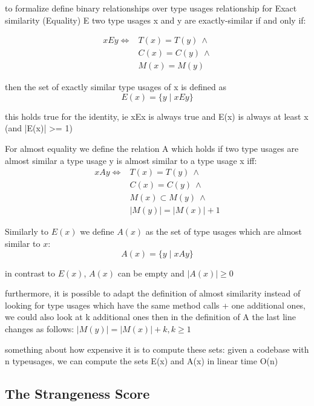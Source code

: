 to formalize define binary relationships over type usages
relationship for Exact similarity (Equality) E
two type usages x and y are exactly-similar if and only if:

\begin{align*}
xEy \iff & T(x) = T(y) \: \land \\
         & C(x) = C(y) \: \land \\
         & M(x) = M(y)
\end{align*}

then the set of exactly similar type usages of x is defined as
\begin{equation*}
E(x) = \{y \mid xEy \}
\end{equation*}

this holds true for the identity, ie xEx is always true and E(x) is always at least {x} (and |E(x)| >= 1)

For almost equality we define the relation A which holds if two type usages are almost similar
a type usage y is almost similar to a type usage x iff:
\begin{align*}
xAy \iff & T(x) = T(y) \: \land \\
         & C(x) = C(y) \: \land \\
         & M(x) \subset M(y) \: \land \\
         & |M(y)| = |M(x)| + 1
\end{align*}

Similarly to $E(x)$ we define $A(x)$ as the set of type usages which are almost similar to $x$:
\begin{equation*}
A(x) = \{y \mid xAy \}
\end{equation*}

in contrast to $E(x)$, $A(x)$ can be empty and $|A(x)|\geq0$

furthermore, it is possible to adapt the definition of almost similarity
instead of looking for type usages which have the same method calls + one additional ones, we could also look at k additional ones
then in the definition of A the last line changes as follows: $|M(y)| = |M(x)| + k, k\geq1$

something about how expensive it is to compute these sets:
given a codebase with n typeusages, we can compute the sets E(x) and A(x) in linear time O(n)

\subsection{The Strangeness Score}

